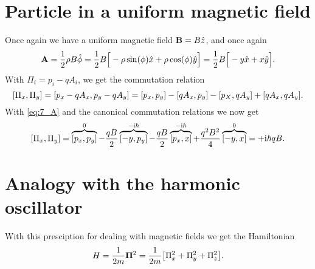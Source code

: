 \documentclass[11pt,letter, swedish, english
]{article}
\begin{document}
\section{Particle in a uniform magnetic field}
Once again we have a uniform magnetic field $\vb{B}=B\hat{z}$, and
once again 
\begin{equation}\label{eq:7_A}
\vb{A}=\frac{1}{2}\rho B\hat{\phi}
=\frac{1}{2}B\Big[-\rho\sin(\phi)\hat{x}+\rho\cos(\phi)\hat{y}\Big]
=\frac{1}{2}B\Big[-y\hat{x}+x\hat{y}\Big].
\end{equation}
With $\Pi_i=p_i-qA_i$, we get the commutation relation
\begin{equation}
\comm{\Pi_x}{\Pi_y}=\comm{p_x-qA_x}{p_y-qA_y}
=\comm{p_x}{p_y}-\comm{qA_x}{p_y}-\comm{p_X}{qA_y}+\comm{qA_x}{qA_y}.
\end{equation}
With \eqref{eq:7_A} and the canonical commutation relations we now get
\begin{equation}\label{eq:7_comm}
\comm{\Pi_x}{\Pi_y}
=\overbrace{\comm{p_x}{p_y}}^{0}
-\frac{qB}{2}\overbrace{\comm{-y}{p_y}}^{-\ii\hbar}
-\frac{qB}{2}\overbrace{\comm{p_x}{x}}^{-\ii\hbar}
+\frac{q^2B^2}{4}\overbrace{\comm{-y}{x}}^{0}
=+\ii\hbar qB.
\end{equation}

\section{Analogy with the harmonic oscillator}
With this presciption for dealing with magnetic fields we get the
Hamiltonian 
\begin{equation}\label{eq:7_H}
H=\frac{1}{2m}\vb{\Pi}^2=\frac{1}{2m}\qty[\Pi_x^2+\Pi_y^2+\Pi_z^2]. 
\end{equation}
\end{document}
